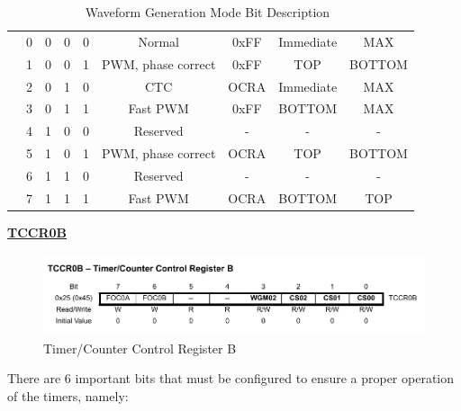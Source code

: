 \begin{itemize}
\begin{table}[H]
{\begin{tabular}[t]{lcccccccc}
                & 0 & 0 & 0 & 0 & Normal              & 0xFF & Immediate & MAX     \\
                & 1 & 0 & 0 & 1 & PWM, phase correct  & 0xFF & TOP       & BOTTOM  \\
                & 2 & 0 & 1 & 0 & CTC                 & OCRA & Immediate & MAX     \\
                & 3 & 0 & 1 & 1 & Fast PWM            & 0xFF & BOTTOM    & MAX     \\
                & 4 & 1 & 0 & 0 & Reserved            &  -   &  -        &  -      \\
                & 5 & 1 & 0 & 1 & PWM, phase correct  & OCRA & TOP       & BOTTOM  \\
                & 6 & 1 & 1 & 0 & Reserved            &  -   &  -        &  -      \\
                & 7 & 1 & 1 & 1 & Fast PWM            & OCRA & BOTTOM    & TOP     \\
    
                \bottomrule
            \end{tabular}
            \caption{Waveform Generation Mode Bit Description~\autocite{ATMEGA328P}}
            \label{table:WGM0x}
            }
    \end{table}
\end{itemize}



\medskip
\underline{\textbf{TCCR0B}}
\medskip


\begin{figure}[H]
    \centering
    \includegraphics[width = \textwidth]{Graphics/MICROS/Practice 4/DATASHEET/TCCR0B.pdf}
    \caption{Timer/Counter Control Register B}
    \label{fig:TCCR0B}
\end{figure}

There are 6 important bits that must be configured to ensure a proper operation of the timers, namely:

